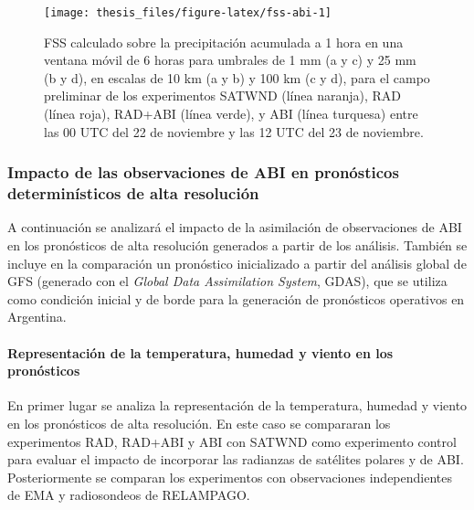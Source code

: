 \documentclass[12pt,oneside,a4paper]{reedthesis}
\begin{document}
\begin{figure}
\texttt{[image: thesis\_files/figure-latex/fss-abi-1]} \caption{FSS calculado sobre la precipitación acumulada a 1 hora en una ventana móvil de 6 horas para umbrales de 1 mm (a y c) y 25 mm (b y d), en escalas de 10 km (a y b) y 100 km (c y d), para el campo preliminar de los experimentos SATWND (línea naranja), RAD (línea roja), RAD+ABI (línea verde), y ABI (línea turquesa) entre las 00 UTC del 22 de noviembre y las 12 UTC del 23 de noviembre.}\label{fig:fss-abi}
\end{figure}
\hypertarget{impacto-de-las-observaciones-de-abi-en-pronuxf3sticos-determinuxedsticos-de-alta-resoluciuxf3n}{%
\subsubsection{Impacto de las observaciones de ABI en pronósticos determinísticos de alta resolución}\label{impacto-de-las-observaciones-de-abi-en-pronuxf3sticos-determinuxedsticos-de-alta-resoluciuxf3n}}

A continuación se analizará el impacto de la asimilación de observaciones de ABI en los pronósticos de alta resolución generados a partir de los análisis. También se incluye en la comparación un pronóstico inicializado a partir del análisis global de GFS (generado con el \emph{Global Data Assimilation System}, GDAS), que se utiliza como condición inicial y de borde para la generación de pronósticos operativos en Argentina.

\hypertarget{representaciuxf3n-de-la-temperatura-humedad-y-viento-en-los-pronuxf3sticos}{%
\paragraph{Representación de la temperatura, humedad y viento en los pronósticos}\label{representaciuxf3n-de-la-temperatura-humedad-y-viento-en-los-pronuxf3sticos}}

En primer lugar se analiza la representación de la temperatura, humedad y viento en los pronósticos de alta resolución. En este caso se compararan los experimentos RAD, RAD+ABI y ABI con SATWND como experimento control para evaluar el impacto de incorporar las radianzas de satélites polares y de ABI. Posteriormente se comparan los experimentos con observaciones independientes de EMA y radiosondeos de RELAMPAGO.
\end{document}
